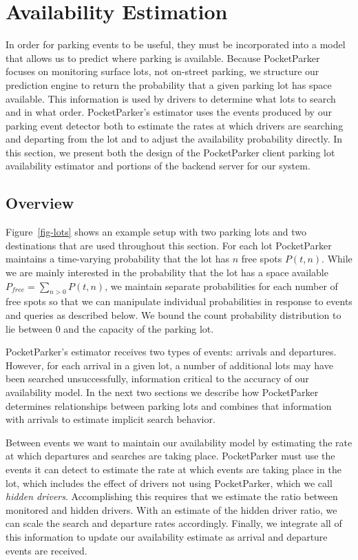 \documentclass{sigchi}
\begin{document}
\section{Availability Estimation}

In order for parking events to be useful, they must be incorporated into a
model that allows us to predict where parking is available. Because
PocketParker focuses on monitoring surface lots, not on-street parking, we
structure our prediction engine to return the probability that a given
parking lot has space available. This information is used by drivers to
determine what lots to search and in what order. PocketParker's estimator
uses the events produced by our parking event detector both to estimate the
rates at which drivers are searching and departing from the lot and to adjust
the availability probability directly. In this section, we present both the
design of the PocketParker client parking lot availability estimator and
portions of the backend server for our system.

\subsection{Overview}

Figure~\ref{fig-lots} shows an example setup with two parking lots and two
destinations that are used throughout this section. For each lot PocketParker
maintains a time-varying probability that the lot has $n$ free spots $P(t,
n)$. While we are mainly interested in the probability that the lot has a
space available $P_{free} = \sum_{n > 0} P(t, n)$, we maintain separate
probabilities for each number of free spots so that we can manipulate
individual probabilities in response to events and queries as described
below. We bound the count probability distribution to lie between 0 and the
capacity of the parking lot. 

PocketParker's estimator receives two types of events: arrivals and
departures. However, for each arrival in a given lot, a number of additional
lots may have been searched unsuccessfully, information critical to the
accuracy of our availability model. In the next two sections we describe how
PocketParker determines relationships between parking lots and combines that
information with arrivals to estimate implicit search behavior.

Between events we want to maintain our availability model by estimating the
rate at which departures and searches are taking place. PocketParker must use
the events it can detect to estimate the rate at which events are taking
place in the lot, which includes the effect of drivers not using
PocketParker, which we call \textit{hidden drivers}. Accomplishing this
requires that we estimate the ratio between monitored and hidden drivers.
With an estimate of the hidden driver ratio, we can scale the search and
departure rates accordingly. Finally, we integrate all of this information to
update our availability estimate as arrival and departure events are
received.
\end{document}

